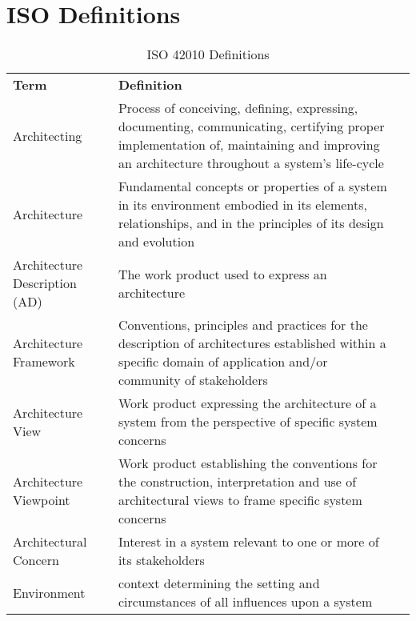 \section{ISO Definitions}
\begin{table}[h]
\centering
\begin{tabularx}{\textwidth}{|p{2.5cm}|X|l}
\cline{1-2}
\cellcolor[HTML]{C0C0C0}\textbf{Term} & \cellcolor[HTML]{C0C0C0}\textbf{Definition}                                                                                                                                              &  \\ \cline{1-2}
Architecting                          & Process of conceiving, defining, expressing, documenting, communicating, certifying proper implementation of, maintaining and improving an architecture throughout a system's life-cycle &  \\ \cline{1-2}
Architecture                          & Fundamental concepts or properties of a system in its environment embodied in its elements, relationships, and in the principles of its design and evolution                             &  \\ \cline{1-2}
Architecture Description (AD)         & The work product used to express an architecture                                                                                                                                         &  \\ \cline{1-2}
Architecture Framework                & Conventions, principles and practices for the description of architectures established within a specific domain of application and/or community of stakeholders                          &  \\ \cline{1-2}
Architecture View                     & Work product expressing the architecture of a system from the perspective of specific system concerns                                                                                    &  \\ \cline{1-2}
Architecture Viewpoint                & Work product establishing the conventions for the construction, interpretation and use of architectural views to frame specific system concerns                                          &  \\ \cline{1-2}
Architectural Concern                 & Interest in a system relevant to one or more of its stakeholders                                                                                                                         &  \\ \cline{1-2}
Environment                           & context determining the setting and circumstances of all influences upon a system                                                                                                        &  \\ \cline{1-2}
\end{tabularx}
\caption{ISO 42010 Definitions}
\label{table:iso_def}
\end{table}
\newpage



